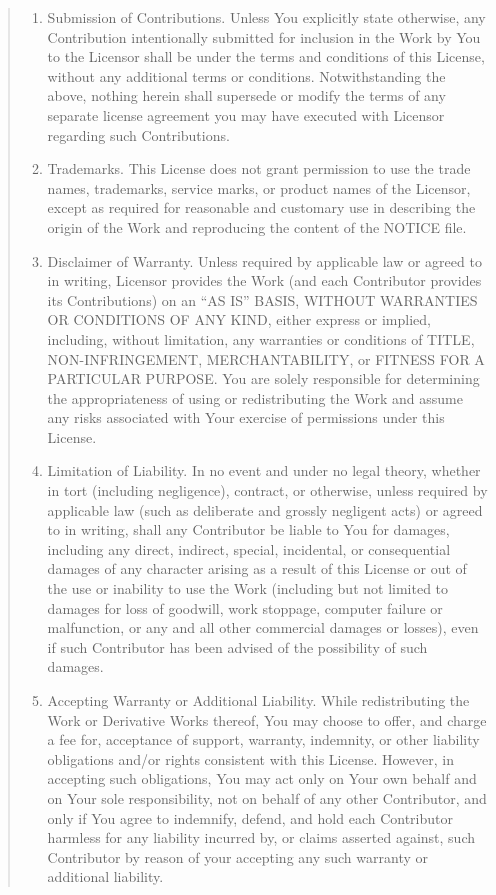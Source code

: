 \documentclass[letterpaper,10pt,english]{sphinxmanual}
\begin{document}
\begin{quote}
\begin{enumerate}
\item {} 
Submission of Contributions. Unless You explicitly state otherwise,
any Contribution intentionally submitted for inclusion in the Work
by You to the Licensor shall be under the terms and conditions of
this License, without any additional terms or conditions.
Notwithstanding the above, nothing herein shall supersede or modify
the terms of any separate license agreement you may have executed
with Licensor regarding such Contributions.

\item {} 
Trademarks. This License does not grant permission to use the trade
names, trademarks, service marks, or product names of the Licensor,
except as required for reasonable and customary use in describing the
origin of the Work and reproducing the content of the NOTICE file.

\item {} 
Disclaimer of Warranty. Unless required by applicable law or
agreed to in writing, Licensor provides the Work (and each
Contributor provides its Contributions) on an “AS IS” BASIS,
WITHOUT WARRANTIES OR CONDITIONS OF ANY KIND, either express or
implied, including, without limitation, any warranties or conditions
of TITLE, NON-INFRINGEMENT, MERCHANTABILITY, or FITNESS FOR A
PARTICULAR PURPOSE. You are solely responsible for determining the
appropriateness of using or redistributing the Work and assume any
risks associated with Your exercise of permissions under this License.

\item {} 
Limitation of Liability. In no event and under no legal theory,
whether in tort (including negligence), contract, or otherwise,
unless required by applicable law (such as deliberate and grossly
negligent acts) or agreed to in writing, shall any Contributor be
liable to You for damages, including any direct, indirect, special,
incidental, or consequential damages of any character arising as a
result of this License or out of the use or inability to use the
Work (including but not limited to damages for loss of goodwill,
work stoppage, computer failure or malfunction, or any and all
other commercial damages or losses), even if such Contributor
has been advised of the possibility of such damages.

\item {} 
Accepting Warranty or Additional Liability. While redistributing
the Work or Derivative Works thereof, You may choose to offer,
and charge a fee for, acceptance of support, warranty, indemnity,
or other liability obligations and/or rights consistent with this
License. However, in accepting such obligations, You may act only
on Your own behalf and on Your sole responsibility, not on behalf
of any other Contributor, and only if You agree to indemnify,
defend, and hold each Contributor harmless for any liability
incurred by, or claims asserted against, such Contributor by reason
of your accepting any such warranty or additional liability.


\end{enumerate}
\end{quote}
\end{document}
